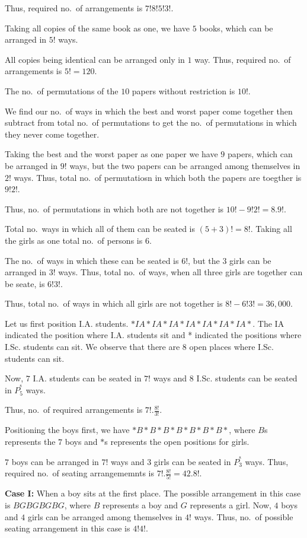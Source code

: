   Thus, required no.\ of arrangements is $7!8!5!3!$.
\item Taking all copies of the same book as one, we have $5$ books, which can be arranged in $5!$ ways.

  All copies being identical can be arranged only in $1$ way. Thus, required no.\ of arrangements is $5! =
  120$.
\item The no.\ of permutations of the $10$ papers without restriction is $10!$.

  We find our no.\ of ways in which the best and worst paper come together then subtract from total no.\ of
  permutations to get the no.\ of permutations in which they never come together.

  Taking the best and the worst paper as one paper we have $9$ papers, which can be arranged in $9!$ ways,
  but the two papers can be arranged among themselves in $2!$ ways. Thus, total no.\ of permutatiosn in which
  both the papers are toegther is $9!2!$.

  Thus, no.\ of permutations in which both are not together is $10! - 9!2! = 8.9!$.
\item Total no.\ ways in which all of them can be seated is $(5 + 3)! = 8!$. Taking all the girls as one
  total no.\ of persons is $6$.

  The no.\ of ways in which these can be seated is $6!$, but the $3$ girls can be arranged in $3!$
  ways. Thus, total no.\ of ways, when all three girls are together can be seate, is $6!3!$.

  Thus, total no.\ of ways in which all girls are not together is $8! - 6!3! = 36,000$.
\item Let us first position I.A. students. $*IA*IA*IA*IA*IA*IA*IA*$. The IA indicated the position where
  I.A. students sit and * indicated the positions where I.Sc. students can sit. We observe that there are
  $8$ open places where I.Sc. students can sit.

  Now, $7$ I.A. students can be seated in $7!$ ways and $8$ I.Sc. students can be seated in $P_5^^8$ ways.

  Thus, no.\ of required arrangements is $7!.\frac{8!}{3!}$.
\item Positioning the boys first, we have $*B*B*B*B*B*B*B*$, where $B$s represents the $7$ boys and $*$s
  represents the open positions for girls.

  $7$ boys can be arranged in $7!$ ways and $3$ girls can be seated in $P_3^^8$ ways. Thus, required no.\ of
  seating arrangememnts is $7!.\frac{8!}{5!} = 42.8!$.
\item {\bf Case I:} When a boy sits at the first place. The possible arrangement in this case is
  $BGBGBGBG$, where $B$ represents a boy and $G$ represents a girl. Now, $4$ boys and $4$ girls can be
  arranged among themselves in $4!$ ways. Thus, no.\ of possible seating arrangement in this case is $4!4!$.

